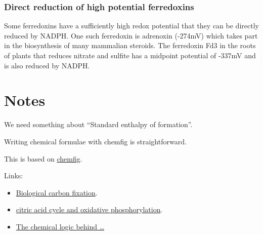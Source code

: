 \documentclass{article}
\begin{document}
\subsubsection{Direct reduction of high potential ferredoxins}
Some ferredoxins have a sufficiently high redox potential that they can be directly
reduced by NADPH\@. One such ferredoxin is adrenoxin (-274mV) which takes part in the
biosynthesis of many mammalian steroids.  The ferredoxin Fd3 in the roots of plants that
reduces nitrate and sulfite has a midpoint potential of -337mV and is also reduced by
NADPH\@.


\pagebreak
\section{Notes}\label{sec_notes}

We need something about ``Standard enthalpy of formation''.

Writing chemical formulae with chemfig is straightforward.

This is based on \href{https://www.overleaf.com/learn/latex/Chemistry_formulae}{chemfig}.

Links:
\begin{itemize}
    \item\href{https://en.wikipedia.org/wiki/Biological_carbon_fixation}{Biological carbon fixation}.
    \item\href{https://courses.lumenlearning.com/wm-nmbiology1/chapter/citric-acid-cycle-and-oxidative-phosphorylation/}{citric
        acid cycle and oxidative phosphorylation}.
    \item\href{http://homepage.ufp.pt/pedros/bq/tca.htm}{The chemical logic behind \ldots}
\end{itemize}
\end{document}
